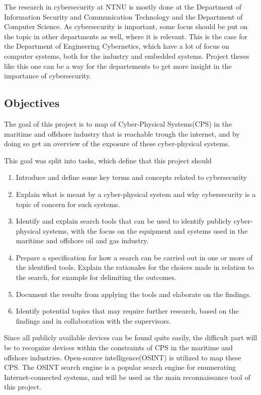 The research in cybersecurity at NTNU is mostly done at the Department of Information Security and Communication Technology and  the Department of Computer Science. As cybersecurity is important, some focus should be put on the topic in other departments as well, where it is relevant. This is the case for the Department of Engineering Cybernetics, which have a lot of focus on computer systems, both for the industry and embedded systems. Project theses like this one can be a way for the departements to get more insight in the importance of cybersecurity.

\subsection{Objectives}
The goal of this project is to map of Cyber-Physical Systems(CPS) in the maritime and offshore industry that is reachable trough the internet, and by doing so get an overview of the exposure of these cyber-physical systems.

This goal was split into tasks, which define that this project should
\begin{enumerate}
    \item Introduce and define some key terms and concepts related to cybersecurity
    \item Explain what is meant by a cyber-physical system and why cybersecurity is a topic of concern for such systems.
    \item Identify and explain search tools that can be used to identify publicly cyber-physical systems, with the focus on the equipment and systems used in the maritime and offshore oil and gas industry. 
    \item Prepare a specification for how a search can be carried out in one or more of the identified tools. Explain the rationales for the choices made in relation to the search, for example for delimiting the outcomes.
    \item Document the results from applying the tools and elaborate on the findings.
    \item Identify potential topics that may require further research, based on the findings and in collaboration with the supervisors.
\end{enumerate}

Since all publicly available devices can be found quite easily, the difficult part will be to recognize devices within the constraints of CPS in the maritime and offshore industries.
Open-source intelligence(OSINT) is utilized to map these CPS. The OSINT search engine \href{https://shodan.io}{\color{blue}{Shodan}}\cite{shodan} is a popular search engine for enumerating Internet-connected systems, and will be used as the main reconnaissance tool of this project. 



